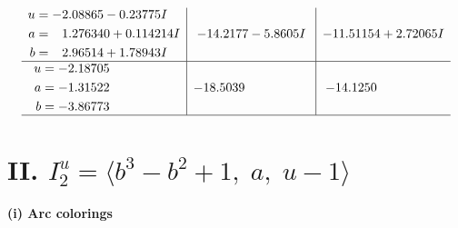 \documentclass[1p]{elsarticle_modified}
\theoremstyle{definition}
\begin{document}
$$\begin{array}{c|c|c}
\begin{aligned}
u &= -2.08865 - 0.23775 I \\
a &= \phantom{-}1.276340 + 0.114214 I \\
b &= \phantom{-}2.96514 + 1.78943 I\end{aligned}
 & -14.2177 - 5.8605 I & -11.51154 + 2.72065 I \\ \hline\begin{aligned}
u &= -2.18705\phantom{ +0.000000I} \\
a &= -1.31522\phantom{ +0.000000I} \\
b &= -3.86773\phantom{ +0.000000I}\end{aligned}
 & -18.5039\phantom{ +0.000000I} & -14.1250\phantom{ +0.000000I}\\
 \hline 
 \end{array}$$\newpage\newpage\renewcommand{\arraystretch}{1}
\centering \section*{II. $I^u_{2}= \langle b^3- b^2+1,\;a,\;u-1 \rangle$}
\flushleft \textbf{(i) Arc colorings}\\
\end{document}
